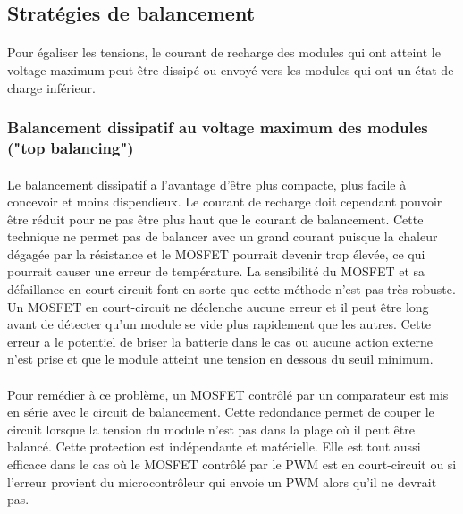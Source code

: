 \subsection*{Stratégies de balancement}
\paragraph*{}
Pour égaliser les tensions, le courant de recharge des modules qui ont atteint le voltage maximum peut être dissipé ou envoyé vers les modules qui ont un état de charge inférieur. 

\subsubsection*{Balancement dissipatif au voltage maximum des modules ("top balancing")}
\paragraph*{}
Le balancement dissipatif a l'avantage d'être plus compacte, plus facile à concevoir et moins dispendieux. Le courant de recharge doit cependant pouvoir être réduit pour ne pas être plus haut que le courant de balancement. Cette technique ne permet pas de balancer avec un grand courant puisque la chaleur dégagée par la résistance et le MOSFET pourrait devenir trop élevée, ce qui pourrait causer une erreur de température. La sensibilité du MOSFET et sa défaillance en court-circuit  font en sorte que cette méthode n'est pas très robuste. Un MOSFET en court-circuit ne déclenche aucune erreur et il peut être long avant de détecter qu'un module se vide plus rapidement que les autres. Cette erreur a le potentiel de briser la batterie dans le cas ou aucune action externe n'est prise et que le module atteint une tension en dessous du seuil minimum.

\paragraph*{}
Pour remédier à ce problème, un MOSFET contrôlé par un comparateur est mis en série avec le circuit de balancement. Cette redondance permet de couper le circuit lorsque la tension du module n'est pas dans la plage où il peut être balancé. Cette protection est indépendante et matérielle. Elle est tout aussi efficace dans le cas où le MOSFET contrôlé par le PWM est en court-circuit ou si l'erreur provient du microcontrôleur qui envoie un PWM alors qu'il ne devrait pas.

